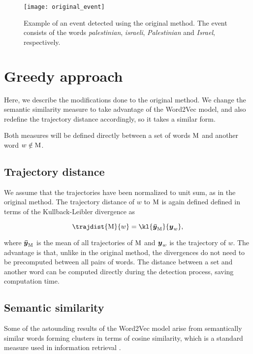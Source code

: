 \begin{figure}[H]
  \centering
  \texttt{[image: original\_event]}  %
  \caption{Example of an event detected using the original method. The event consists of the words \textit{palestinian}, \textit{israeli}, \textit{Palestinian} and \textit{Israel}, respectively.}
  \label{fig:original-event}
\end{figure}


\section{Greedy approach}
Here, we describe the modifications done to the original method. We change the semantic similarity measure to take advantage of the Word2Vec model, and also redefine the trajectory distance accordingly, so it takes a similar form.

Both measures will be defined directly between a set of words $\text{M}$ and another word $w \notin \text{M}$.

\subsection{Trajectory distance}
We assume that the trajectories have been normalized to unit sum, as in the original method. The trajectory distance of $w$ to $\text{M}$ is again defined defined in terms of the Kullback-Leibler divergence as

\begin{equation}
	\trajdist{\featset}{w} = \kl{\vect{\bar{\traj}}_{\featset}}{\vect{\traj}_{w}},
\end{equation}

where $\vect{\bar{\traj}}_{\featset}$ is the mean of all trajectories of $\text{M}$ and $\vect{\traj}_{w}$ is the trajectory of $w$. The advantage is that, unlike in the original method, the divergences do not need to be precomputed between all pairs of words. The distance between a set and another word can be computed directly during the detection process, saving computation time.


\subsection{Semantic similarity}
Some of the astounding results of the Word2Vec model arise from semantically similar words forming clusters \citep{linguistic-regularities} in terms of cosine similarity, which is a standard measure used in information retrieval \citep{information-retrieval, cosine-similarity}.

